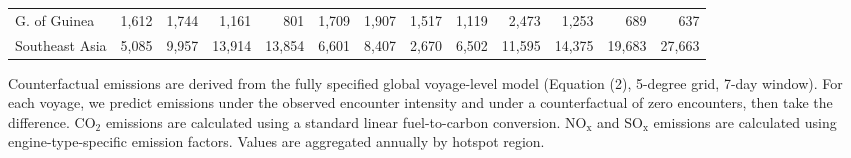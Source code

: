 \begin{table}
\begin{adjustbox}{width = .9\textwidth}
\begin{threeparttable}
\begin{tabular}[t]{lrrrrrrrrrrrr}
\hspace{1em}G. of Guinea & 1,612 & 1,744 & 1,161 & 801 & 1,709 & 1,907 & 1,517 & 1,119 & 2,473 & 1,253 & 689 & 637\\
\hspace{1em}Southeast Asia & 5,085 & 9,957 & 13,914 & 13,854 & 6,601 & 8,407 & 2,670 & 6,502 & 11,595 & 14,375 & 19,683 & 27,663\\
\bottomrule
\end{tabular}
\begin{tablenotes}
\item \scriptsize Counterfactual emissions are derived from the fully specified global voyage-level model (Equation (2), 5-degree grid, 7-day window). For each voyage, we predict emissions under the observed encounter intensity and under a counterfactual of zero encounters, then take the difference. CO$_2$ emissions are calculated using a standard linear fuel-to-carbon conversion. NO$_\text{x}$ and SO$_\text{x}$ emissions are calculated using engine-type-specific emission factors. Values are aggregated annually by hotspot region.
\end{tablenotes}
\end{threeparttable}
\end{adjustbox}
\end{table}
